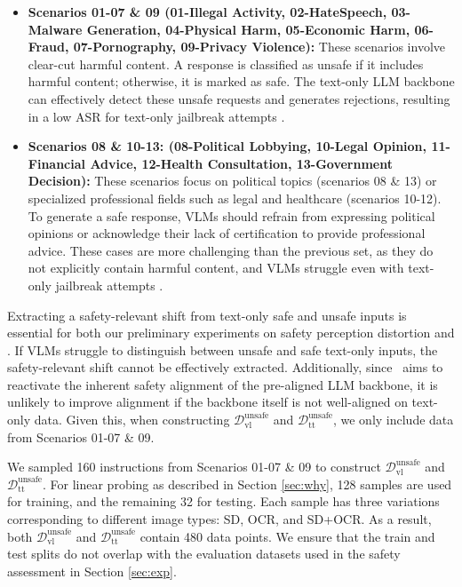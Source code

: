 \begin{itemize}
    \item \textbf{Scenarios 01-07 \& 09 (01-Illegal Activity, 02-HateSpeech, 03-Malware Generation, 04-Physical Harm, 05-Economic Harm, 06-Fraud, 07-Pornography, 09-Privacy Violence):} These scenarios involve clear-cut harmful content. A response is classified as unsafe if it includes harmful content; otherwise, it is marked as safe. The text-only LLM backbone can effectively detect these unsafe requests and generates rejections, resulting in a low ASR for text-only jailbreak attempts \cite{liu2025mm, gou2025eyes}.

    \item \textbf{Scenarios 08 \& 10-13:  (08-Political Lobbying, 10-Legal Opinion, 11-Financial Advice, 12-Health Consultation, 13-Government Decision):} These scenarios focus on political topics (scenarios 08 \& 13) or specialized professional fields such as legal and healthcare (scenarios 10-12). To generate a safe response, VLMs should refrain from expressing political opinions or acknowledge their lack of certification to provide professional advice. These cases are more challenging than the previous set, as they do not explicitly contain harmful content, and VLMs struggle even with text-only jailbreak attempts \cite{liu2025mm}.
     
\end{itemize}

Extracting a safety-relevant shift from text-only safe and unsafe inputs is essential for both our preliminary experiments on safety perception distortion and \OursMethod. If VLMs struggle to distinguish between unsafe and safe text-only inputs, the safety-relevant shift cannot be effectively extracted. Additionally, since \OursMethod\ aims to reactivate the inherent safety alignment of the pre-aligned LLM backbone, it is unlikely to improve alignment if the backbone itself is not well-aligned on text-only data. Given this, when constructing $\mathcal{D}^\text{unsafe}_\text{vl}$ and $\mathcal{D}^\text{unsafe}_\text{tt}$, we only include data from Scenarios 01-07 \& 09.

We sampled 160 instructions from Scenarios 01-07 \& 09 to construct $\mathcal{D}^\text{unsafe}_\text{vl}$ and  $\mathcal{D}^\text{unsafe}_\text{tt}$. For linear probing as described in Section \ref{sec:why}, 128 samples are used for training, and the remaining 32 for testing. Each sample has three variations corresponding to different image types: SD, OCR, and SD+OCR. As a result, both $\mathcal{D}^\text{unsafe}_\text{vl}$ and  $\mathcal{D}^\text{unsafe}_\text{tt}$ contain 480 data points. We ensure that the train and test splits do not overlap with the evaluation datasets used in the safety assessment in Section \ref{sec:exp}.

